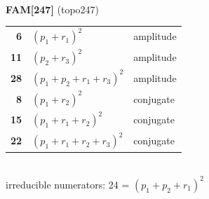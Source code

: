 \documentclass[10pt]{article}
\begin{document}
\begin{minipage}[t]{0.48\textwidth}
{}\\[2mm]\textbf{FAM[247]} (topo247)\\[2pt]{\footnotesize\begin{tabular}{@{}r@{\ \ }l@{\ \ }l@{}}\textbf{6} & $(p_1+r_1)^2$ & amplitude\\
\textbf{11} & $(p_2+r_3)^2$ & amplitude\\
\textbf{28} & $(p_1+p_2+r_1+r_3)^2$ & amplitude\\
\textbf{8} & $(p_1+r_2)^2$ & conjugate\\
\textbf{15} & $(p_1+r_1+r_2)^2$ & conjugate\\
\textbf{22} & $(p_1+r_1+r_2+r_3)^2$ & conjugate\\\end{tabular}}\\[2pt]{\scriptsize irreducible numerators: 24 = $(p_1+p_2+r_1)^2$}\end{minipage}

\bigskip
\end{document}
